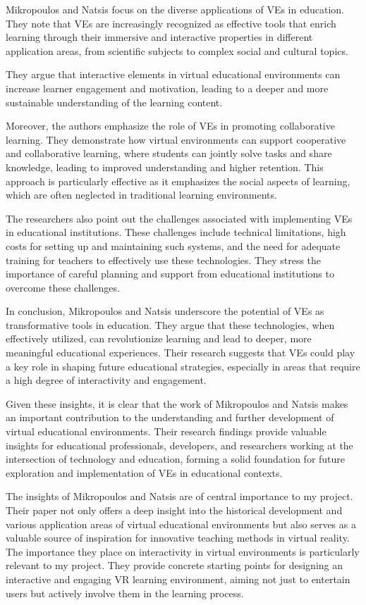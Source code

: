 \documentclass[draft, final]{vutinfth} %
\begin{document}
Mikropoulos and Natsis focus on the diverse applications of VEs in education. They note that VEs are increasingly recognized as effective tools that enrich learning through their immersive and interactive properties in different application areas, from scientific subjects to complex social and cultural topics.

They argue that interactive elements in virtual educational environments can increase learner engagement and motivation, leading to a deeper and more sustainable understanding of the learning content.

Moreover, the authors emphasize the role of VEs in promoting collaborative learning. They demonstrate how virtual environments can support cooperative and collaborative learning, where students can jointly solve tasks and share knowledge, leading to improved understanding and higher retention. This approach is particularly effective as it emphasizes the social aspects of learning, which are often neglected in traditional learning environments.

The researchers also point out the challenges associated with implementing VEs in educational institutions. These challenges include technical limitations, high costs for setting up and maintaining such systems, and the need for adequate training for teachers to effectively use these technologies. They stress the importance of careful planning and support from educational institutions to overcome these challenges.

In conclusion, Mikropoulos and Natsis underscore the potential of VEs as transformative tools in education. They argue that these technologies, when effectively utilized, can revolutionize learning and lead to deeper, more meaningful educational experiences. Their research suggests that VEs could play a key role in shaping future educational strategies, especially in areas that require a high degree of interactivity and engagement.

Given these insights, it is clear that the work of Mikropoulos and Natsis makes an important contribution to the understanding and further development of virtual educational environments. Their research findings provide valuable insights for educational professionals, developers, and researchers working at the intersection of technology and education, forming a solid foundation for future exploration and implementation of VEs in educational contexts.

The insights of Mikropoulos and Natsis are of central importance to my project. Their paper not only offers a deep insight into the historical development and various application areas of virtual educational environments but also serves as a valuable source of inspiration for innovative teaching methods in virtual reality. The importance they place on interactivity in virtual environments is particularly relevant to my project. They provide concrete starting points for designing an interactive and engaging VR learning environment, aiming not just to entertain users but actively involve them in the learning process.
\end{document}

